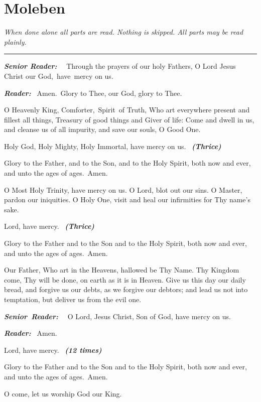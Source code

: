 \chapter{Moleben}

\emph{When done alone all parts are read. Nothing is skipped. All parts may be read plainly.}

\begin{center}
\rule{0.5\linewidth}{0.5pt}
\end{center}

\textbf{\emph{Senior Reader:}}
~~Through the prayers of our holy Fathers, O Lord Jesus Christ our God,~have~mercy on us.

\textbf{\emph{Reader:}}
~Amen.~Glory to Thee, our God, glory to Thee.

O Heavenly King, Comforter,~Spirit~of Truth, Who art everywhere present and fillest all things, Treasury of good things and Giver of life: Come and dwell in us, and cleanse us of all impurity, and save our souls, O Good One.

Holy God, Holy Mighty, Holy Immortal, have mercy on
us.
~\textbf{\emph{(Thrice)}}

Glory to the Father, and to the Son, and to the Holy Spirit, both now and ever, and unto the ages of ages.~Amen.

O Most Holy Trinity, have mercy on us. O Lord, blot out our sins. O Master, pardon our iniquities. O Holy One, visit and heal our infirmities for Thy name's sake.

Lord, have mercy.
~\textbf{\emph{(Thrice)}}

Glory to the Father and to the Son and to the Holy Spirit, both now and ever, and unto the ages of ages.~Amen.

Our Father, Who art in the Heavens, hallowed be Thy Name. Thy Kingdom come, Thy will be done, on earth as it is in Heaven. Give us this day our daily bread, and forgive us our debts, as we forgive our debtors; and lead us not into temptation, but deliver us from the evil one.

\textbf{\emph{Senior~Reader:}}
~~O Lord, Jesus Christ, Son of God, have mercy on us.

\textbf{\emph{Reader:}}
~Amen.

Lord, have mercy.
~\textbf{\emph{(12 times)}}

Glory to the Father and to the Son and to the Holy Spirit, both now and ever, and unto the ages of ages.~Amen.

O come, let us worship God our King.

